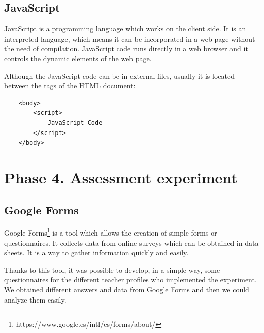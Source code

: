 \subsection{JavaScript}
\label{subsec:javascript}

JavaScript is a programming language which works on the client side. It is an interpreted language, which means it can be incorporated in a web page without the need of compilation. JavaScript code runs directly in a web browser and it controls the dynamic elements of the web page. 

Although the JavaScript code can be in external files, usually it is located between the tags of the HTML document:
{\footnotesize
\begin{verbatim}
    <body>
        <script>
            JavaScript Code
        </script>        
    </body>
\end{verbatim}
}



\section{Phase 4. Assessment experiment}
\label{sec:phase_4}

\subsection{Google Forms}
\label{subsec:google_forms}

Google Forms\footnote{https://www.google.es/intl/es/forms/about/} is a tool which allows the creation of simple forms or questionnaires. It collects data from online surveys which can be obtained in data sheets. It is a way to gather information quickly and easily.

Thanks to this tool, it was possible to develop, in a simple way, some questionnaires for the different teacher profiles who implemented the experiment. We obtained different answers and data from Google Forms and then we could analyze them easily.


